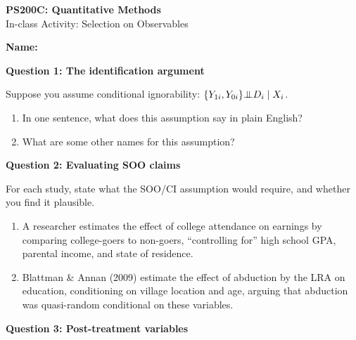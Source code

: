 \documentclass[11pt]{article}
\newcommand{\indep}{{\bot\negthickspace\negthickspace\bot}}
\begin{document}
\begin{center}
{\Large \textbf{PS200C: Quantitative Methods}} \\[6pt]
{\large In-class Activity: Selection on Observables}
\end{center}

\vspace{4pt}
\noindent\textbf{Name:} \hrulefill

\vspace{14pt}

\noindent\textbf{Question 1: The identification argument}

\medskip
\noindent Suppose you assume conditional ignorability: $\{Y_{1i}, Y_{0i}\} \indep D_i \mid X_i$.

\begin{enumerate}[label=(\alph*)]
\item In one sentence, what does this assumption say in plain English?

\vspace{2cm}

\item What are some other names for this assumption?

\vspace{2cm}
\end{enumerate}


\noindent\textbf{Question 2: Evaluating SOO claims}

\medskip
\noindent For each study, state what the SOO/CI assumption would require, and whether you find it plausible.

\begin{enumerate}[label=(\alph*)]
\item A researcher estimates the effect of college attendance on earnings by comparing college-goers to non-goers, ``controlling for'' high school GPA, parental income, and state of residence.

\vspace{2.5cm}

\item Blattman \& Annan (2009) estimate the effect of abduction by the LRA on education, conditioning on village location and age, arguing that abduction was quasi-random conditional on these variables.

\vspace{2.5cm}
\end{enumerate}

\newpage

\noindent\textbf{Question 3: Post-treatment variables}
\end{document}
